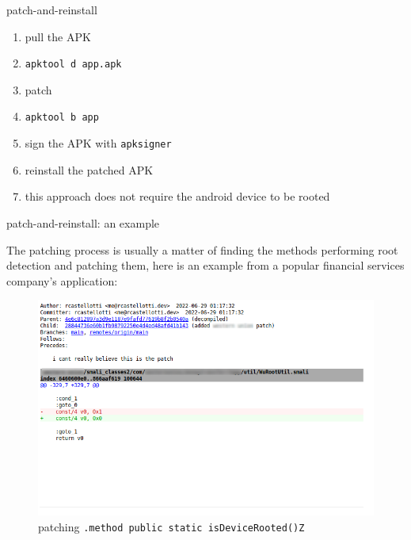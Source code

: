 \documentclass{beamer}
\begin{document}
\begin{frame}{patch-and-reinstall}

    \begin{enumerate}[<+->]
        \item pull the APK
        \item {\footnotesize \texttt{apktool d app.apk}}
        \item patch
        \item {\footnotesize \texttt{apktool b app}}
        \item sign the APK with {\footnotesize \texttt{apksigner}}
        \item reinstall the patched APK
        \item this approach does not require the android device to be rooted
    \end{enumerate}

\end{frame}

\begin{frame}[fragile]{patch-and-reinstall: an example}

    The patching process is usually a matter of finding the methods performing root detection and patching them, here is an example from a popular financial services company's application:
    \begin{figure}
        \centering \includegraphics[scale=1.2]{patch.png}
        \caption{patching \texttt{.method public static isDeviceRooted()Z} }
    \end{figure}

\end{frame}
\end{document}
